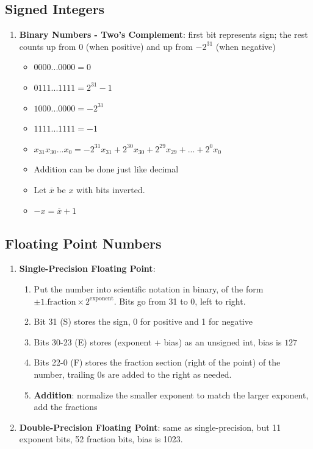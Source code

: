 \documentclass{article}
\begin{document}
\subsection{Signed Integers}
\begin{enumerate}
    \item \textbf{Binary Numbers - Two's Complement}: first bit represents sign; the rest counts up from 0 (when positive) and up from $-2^{31}$ (when negative)
    \begin{multicols}{2}
        \begin{itemize}
            \item $0000...0000 = 0$
            \item $0111...1111 = 2^{31} - 1$
            \item $1000...0000 = -2^{31}$
            \item $1111...1111 = -1$
        \end{itemize}
    \columnbreak
        \begin{itemize}
            \item $x_{31} x_{30}...x_{0} = -2^{31}x_{31} + 2^{30}x_{30} + 2^{29}x_{29} + ... + 2^0x_0$
            \item Addition can be done just like decimal
            \item Let $\overline{x}$ be $x$ with bits inverted.
            \item $-x = \overline{x} + 1$
        \end{itemize}
    \end{multicols}
\end{enumerate}
\subsection{Floating Point Numbers}
\begin{enumerate}
    \item \textbf{Single-Precision Floating Point}:
    \begin{enumerate}
        \item Put the number into scientific notation in binary, of the form $\pm 1.\text{fraction} \times 2^{\text{exponent}}$. Bits go from 31 to 0, left to right.
        \item Bit 31 (S) stores the sign, 0 for positive and 1 for negative
        \item Bits 30-23 (E) stores (exponent + bias) as an unsigned int, bias is $127$
        \item Bits 22-0 (F) stores the fraction section (right of the point) of the number, trailing 0s are added to the right as needed.
        \item \textbf{Addition}: normalize the smaller exponent to match the larger exponent, add the fractions
    \end{enumerate}
    \item \textbf{Double-Precision Floating Point}: same as single-precision, but 11 exponent bits, 52 fraction bits, bias is 1023.
\end{enumerate}
\end{document}
